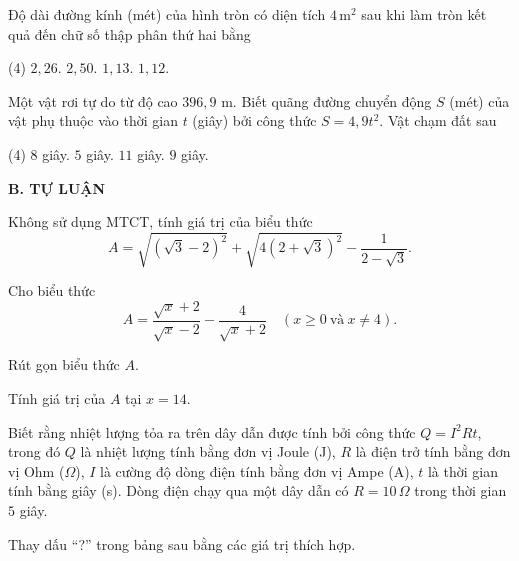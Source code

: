\begin{exercises}
\begin{questions}[resume=SGK]
        \item Độ dài đường kính (mét) của hình tròn có diện tích $4\,\mathrm{m}^2$ sau khi làm tròn kết quả đến chữ số thập phân thứ hai bằng
        \begin{tasks}(4)
            \task[(A)] $2{,}26$.
            \task[(B)] $2{,}50$.
            \task[(C)] $1{,}13$.
            \task[(D)] $1{,}12$.
        \end{tasks}
        \par\noindent\answerbox\par

        \item Một vật rơi tự do từ độ cao $396{,}9$ m. Biết quãng đường chuyển động $S$ (mét) của vật phụ thuộc vào thời gian $t$ (giây) bởi công thức $S=4{,}9t^2$. Vật chạm đất sau
        \begin{tasks}(4)
            \task[(A)] $8$ giây.
            \task[(B)] $5$ giây.
            \task[(C)] $11$ giây.
            \task[(D)] $9$ giây.
        \end{tasks}
        \par\noindent\answerbox\par
    \end{questions}

    \textbf{B. TỰ LUẬN}

    \begin{questions}[resume=SGK]
        \item Không sử dụng MTCT, tính giá trị của biểu thức
        \[
            A=\sqrt{\left(\sqrt{3}-2\right)^2}
            +\sqrt{4\left(2+\sqrt{3}\right)^2}
            -\dfrac{1}{2-\sqrt{3}}.
        \]
        \answerline
        \answerline

        \item Cho biểu thức
        \[
            A=\dfrac{\sqrt{x}+2}{\sqrt{x}-2}
            -\dfrac{4}{\sqrt{x}+2}\quad (x\ge0\ \text{và}\ x\ne4).
        \]
        \begin{questions}
            \item Rút gọn biểu thức $A$.
            \item Tính giá trị của $A$ tại $x=14$.
        \end{questions}
        \answerline
        \answerline

        \item Biết rằng nhiệt lượng tỏa ra trên dây dẫn được tính bởi công thức $Q=I^2Rt$, trong đó $Q$ là nhiệt lượng tính bằng đơn vị Joule (J), $R$ là điện trở tính bằng đơn vị Ohm ($\Omega$), $I$ là cường độ dòng điện tính bằng đơn vị Ampe (A), $t$ là thời gian tính bằng giây (s). Dòng điện chạy qua một dây dẫn có $R=10\,\Omega$ trong thời gian $5$ giây.
        \begin{questions}
            \item Thay dấu ``?'' trong bảng sau bằng các giá trị thích hợp.


\end{questions}
\end{questions}
\end{exercises}
